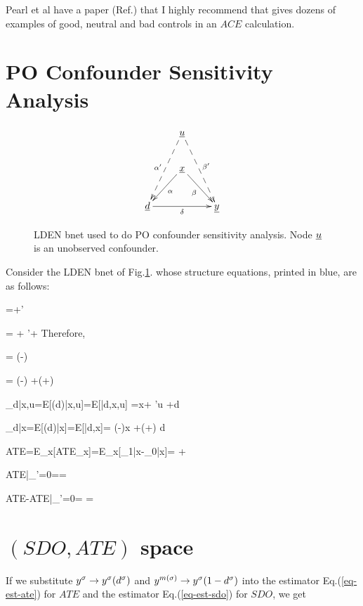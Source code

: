 Pearl et al have a paper
(Ref.\cite{pearl-good-neutral-bad})
that I highly recommend
that gives dozens of examples
of good, neutral and 
bad controls
in an $ACE$ calculation.

\section{PO Confounder Sensitivity Analysis}

\begin{figure}[h!]
$$
\xymatrix{
&\rvu\ar@{-->}[ldd]_{\alp'}
\ar@{-->}[rdd]^{\beta'}
\\
&\rvx
\ar[ld]^\alp
\ar[rd]_\beta
\\
\rvd\ar[rr]_\delta
&&\rvy
}$$
\caption{LDEN bnet used to do PO confounder
sensitivity analysis.
Node ${\underline{u}}$
is an unobserved confounder. }
\label{eq-po-sen-ana}
\end{figure}

Consider the LDEN bnet of Fig.\ref{eq-po-sen-ana}.
whose structure equations,
printed in blue, are as follows:


\beq\color{blue}
\rvd=\alp\rvx +\alp'\rvu
\eeq

\beq\color{blue}
\rvy = \beta \rvx + \beta'\rvu + \delta \rvd
\eeq
Therefore,

\beq
\rvu = (\rvd-\alp\rvx)
\eeq

\beq
\rvy = \left(\beta-\right)\rvx
+\left(\delta+\right)
\rvd
\eeq


\beq
\caly_{d|x,u}=E[\rvy(d)|x,u]=E[\rvy|d,x,u]
=\beta x+ \beta'u +\delta d
\eeq

\beq
\caly_{d|x}=E[\rvy(d)|x]=E[\rvy|d,x]=
\left(\beta-\right)x
+\left(\delta+\right)
d
\eeq  



\beq
ATE=E_x[ATE_x]=E_x[\caly_{1|x}-\caly_{0|x}]=
\delta+
\eeq

\beq
ATE|_{\beta'=0}=\delta=
\eeq

\beq
ATE-ATE|_{\beta'=0}=
=
{}
\eeq


\section{$(SDO,ATE)$ space}
If we substitute
$y^\sigma\rightarrow y^\sigma( d^\sigma)$ and
 $y^{m(\sigma)}\rightarrow y^\sigma(1-d^\sigma)$ 
into 
the estimator
Eq.(\ref{eq-est-ate}) for $ATE$
and the estimator
Eq.(\ref{eq-est-sdo}) for $SDO$,
we get

